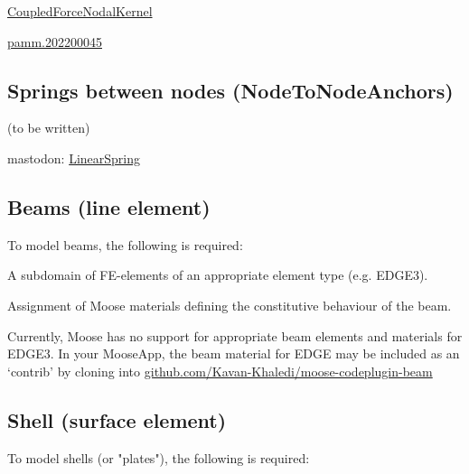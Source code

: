 \href{https://mooseframework.inl.gov/source/nodalkernels/CoupledForceNodalKernel.html}{CoupledForceNodalKernel}

\href{https://onlinelibrary.wiley.com/doi/pdf/10.1002/pamm.202200045}{pamm.202200045}

\subsection{\todomarker Springs between nodes (NodeToNodeAnchors)}
\label{chap:entities-springs}

(to be written)

mastodon:
\href{https://mooseframework.inl.gov/mastodon/source/materials/LinearSpring.html}{LinearSpring}

\subsection{Beams (line element)}
\label{chap:entities-beams}

To model beams, the following is required:

\begin{description}[font=$\bullet$~\normalfont]
  \item [subdomain:] A subdomain of FE-elements of an appropriate element type (e.g. EDGE3).
  \item [materials:] Assignment of Moose materials defining the constitutive behaviour of the beam.
\end{description}

Currently, Moose has no support for appropriate beam elements and materials for
EDGE3. In your MooseApp, the beam material for EDGE may be included as an
‘contrib’ by cloning into
\href{https://github.com/Kavan-Khaledi/moose-codeplugin-beam}{github.com/Kavan-Khaledi/moose-codeplugin-beam}


\subsection{Shell (surface element)}
\label{chap:entities-shell}

To model shells (or "plates"), the following is required:

